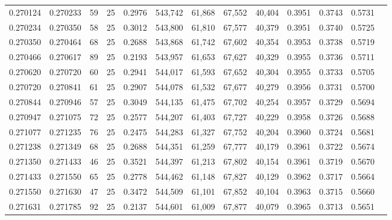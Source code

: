 \begin{tabular}{rrrrrrrrrrrrr}
0.270124 & 0.270233 &    59 &  25 &                                     0.2976 & 543,742 &  61,868 &  67,552 &  40,404 & 0.3951 & 0.3743 & 0.5731 \\
0.270234 & 0.270350 &    58 &  25 &                                     0.3012 & 543,800 &  61,810 &  67,577 &  40,379 & 0.3951 & 0.3740 & 0.5725 \\
0.270350 & 0.270464 &    68 &  25 &                                     0.2688 & 543,868 &  61,742 &  67,602 &  40,354 & 0.3953 & 0.3738 & 0.5719 \\
0.270466 & 0.270617 &    89 &  25 &                                     0.2193 & 543,957 &  61,653 &  67,627 &  40,329 & 0.3955 & 0.3736 & 0.5711 \\
0.270620 & 0.270720 &    60 &  25 &                                     0.2941 & 544,017 &  61,593 &  67,652 &  40,304 & 0.3955 & 0.3733 & 0.5705 \\
0.270720 & 0.270841 &    61 &  25 &                                     0.2907 & 544,078 &  61,532 &  67,677 &  40,279 & 0.3956 & 0.3731 & 0.5700 \\
0.270844 & 0.270946 &    57 &  25 &                                     0.3049 & 544,135 &  61,475 &  67,702 &  40,254 & 0.3957 & 0.3729 & 0.5694 \\
0.270947 & 0.271075 &    72 &  25 &                                     0.2577 & 544,207 &  61,403 &  67,727 &  40,229 & 0.3958 & 0.3726 & 0.5688 \\
0.271077 & 0.271235 &    76 &  25 &                                     0.2475 & 544,283 &  61,327 &  67,752 &  40,204 & 0.3960 & 0.3724 & 0.5681 \\
0.271238 & 0.271349 &    68 &  25 &                                     0.2688 & 544,351 &  61,259 &  67,777 &  40,179 & 0.3961 & 0.3722 & 0.5674 \\
0.271350 & 0.271433 &    46 &  25 &                                     0.3521 & 544,397 &  61,213 &  67,802 &  40,154 & 0.3961 & 0.3719 & 0.5670 \\
0.271433 & 0.271550 &    65 &  25 &                                     0.2778 & 544,462 &  61,148 &  67,827 &  40,129 & 0.3962 & 0.3717 & 0.5664 \\
0.271550 & 0.271630 &    47 &  25 &                                     0.3472 & 544,509 &  61,101 &  67,852 &  40,104 & 0.3963 & 0.3715 & 0.5660 \\
0.271631 & 0.271785 &    92 &  25 &                                     0.2137 & 544,601 &  61,009 &  67,877 &  40,079 & 0.3965 & 0.3713 & 0.5651 \\

\end{tabular}
